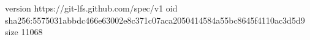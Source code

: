 version https://git-lfs.github.com/spec/v1
oid sha256:5575031abbdc466e63002e8c371c07aca2050414584a55bc8645f4110ac3d5d9
size 11068
